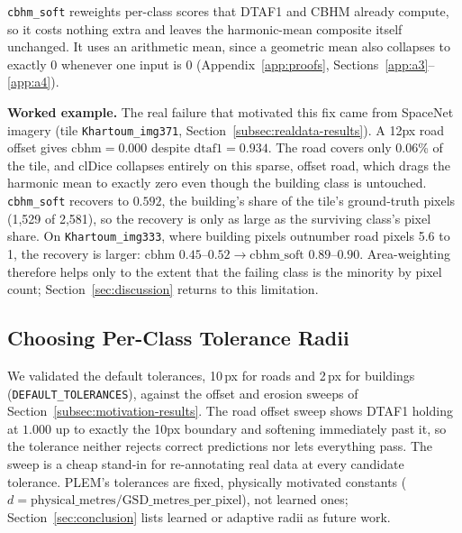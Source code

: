 \texttt{cbhm\_soft} reweights per-class scores that DTAF1 and CBHM already compute, so it costs
nothing extra and leaves the harmonic-mean composite itself unchanged. It uses an arithmetic mean,
since a geometric mean also collapses to exactly 0 whenever one input is 0
(Appendix~\ref{app:proofs}, Sections~\ref{app:a3}--\ref{app:a4}).

\textbf{Worked example.} The real failure that motivated this fix came from SpaceNet imagery
(tile \texttt{Khartoum\_img371}, Section~\ref{subsec:realdata-results}). A 12px road offset gives
$\mathrm{cbhm}=0.000$ despite $\mathrm{dtaf1}=0.934$. The road covers only 0.06\% of the tile,
and clDice collapses entirely on this sparse, offset road, which drags the harmonic mean to exactly
zero even though the building class is untouched. \texttt{cbhm\_soft} recovers to $0.592$, the
building's share of the tile's ground-truth pixels (1,529 of 2,581), so the recovery is only as
large as the surviving class's pixel share. On \texttt{Khartoum\_img333}, where building pixels
outnumber road pixels 5.6 to 1, the recovery is larger: $\mathrm{cbhm}$ $0.45$--$0.52 \to
\mathrm{cbhm\_soft}$ $0.89$--$0.90$. Area-weighting therefore helps only to the extent that the
failing class is the minority by pixel count; Section~\ref{sec:discussion} returns to this
limitation.

\subsection{Choosing Per-Class Tolerance Radii}
\label{subsec:tolerance-radii}

We validated the default tolerances, 10\,px for roads and 2\,px for buildings
(\texttt{DEFAULT\_TOLERANCES}), against the offset and erosion sweeps of Section~\ref{subsec:motivation-results}. The road offset sweep shows
DTAF1 holding at $1.000$ up to exactly the 10px boundary and softening immediately past it, so the
tolerance neither rejects correct predictions nor lets everything pass. The sweep is a cheap
stand-in for re-annotating real data at every candidate tolerance. PLEM's tolerances are fixed,
physically motivated constants ($d = \text{physical\_metres} / \text{GSD\_metres\_per\_pixel}$),
not learned ones; Section~\ref{sec:conclusion} lists learned or adaptive radii as future work.
